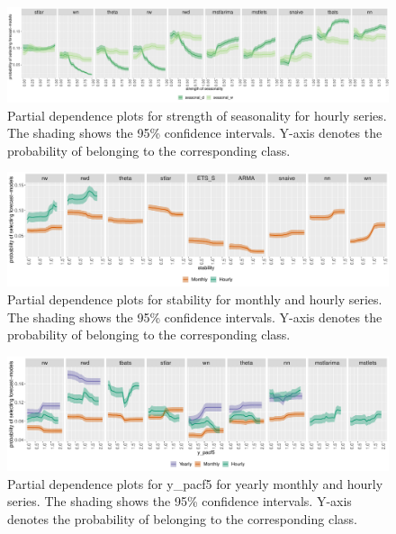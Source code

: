 \documentclass[11pt,a4paper,]{article}
\begin{document}
\begin{figure}[h]

{\centering \includegraphics[width=\textwidth]{figure/seasonalityhourly-1} 

}

\caption{Partial dependence plots for strength of seasonality for hourly series. The shading shows the 95\% confidence intervals. Y-axis denotes the probability of belonging to the corresponding class.}\label{fig:seasonalityhourly}
\end{figure}

\begin{figure}[h]

{\centering \includegraphics[width=\textwidth]{figure/pdpmonthlyhourlyStability-1} 

}

\caption{Partial dependence plots for stability for monthly and hourly series. The shading shows the 95\% confidence intervals. Y-axis denotes the probability of belonging to the corresponding class.}\label{fig:pdpmonthlyhourlyStability}
\end{figure}

\begin{figure}[h]

{\centering \includegraphics[width=\textwidth]{figure/ypacf5-1} 

}

\caption{Partial dependence plots for y\_pacf5 for yearly monthly and hourly series. The shading shows the 95\% confidence intervals. Y-axis denotes the probability of belonging to the corresponding class. }\label{fig:ypacf5}
\end{figure}
\end{document}
